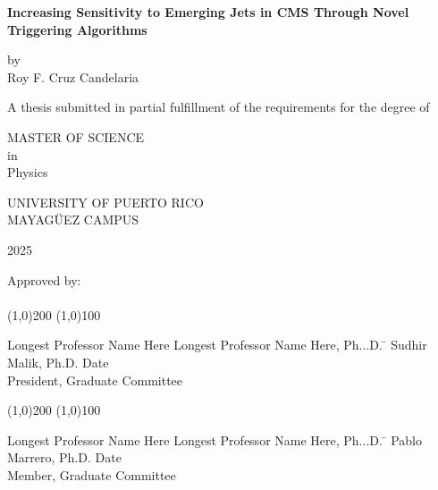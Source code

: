 



\thispagestyle{empty}
\begin{center}
	\begin{singlespace}
		\textbf{Increasing Sensitivity to Emerging Jets in CMS Through Novel Triggering Algorithms}
	\end{singlespace}
	\vspace{4 mm}
	by
	\\
	\vspace{4 mm}
	Roy F. Cruz Candelaria %
	\vspace{4 mm}
	\begin{singlespace}
		A thesis submitted in partial fulfillment of the requirements for the degree of %
	\end{singlespace}
	\vspace{4 mm}
	MASTER OF SCIENCE %
	\\
	in
	\\
	Physics %
	\\
	\vspace{4 mm}
	\begin{singlespace}

		UNIVERSITY OF PUERTO RICO
		\\
		MAYAG\"UEZ CAMPUS
	\end{singlespace}

	2025 %
\end{center}
\bigskip
\bigskip
\bigskip
\bigskip
\bigskip
\bigskip
\bigskip

\noindent Approved by:
\\
\\

\noindent
\line(1,0){200} \hspace{40 mm} \line(1,0){100}\\
\noindent
\vspace{-1.75\baselineskip}
\begin{tabbing}
	Longest Professor Name Here Longest Professor Name Here, Ph...D. \=  \kill
	Sudhir Malik, Ph.D. \>  Date\\President, Graduate Committee  %
\end{tabbing}



\noindent
\line(1,0){200} \hspace{40 mm} \line(1,0){100}\\
\noindent
\vspace{-1.75\baselineskip}
\begin{tabbing}
	Longest Professor Name Here Longest Professor Name Here, Ph...D. \=  \kill
	Pablo Marrero, Ph.D. \>  Date\\Member, Graduate Committee
\end{tabbing}


